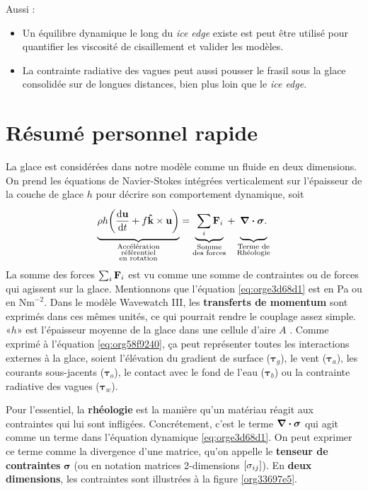 \documentclass[10pt]{article}
\numberwithin{equation}{section}
\newcommand{\kvf}{\vb{\hat{k}}}
\newcommand{\uu}{\vb{u}}
\newcommand{\venti}{\vphantom{\sum_x^x}}
\begin{document}
Aussi :
\begin{itemize}
\item Un équilibre dynamique le long du \emph{ice edge} existe est peut être utilisé pour quantifier les viscosité de cisaillement et valider les modèles.
\item La contrainte radiative des vagues peut aussi pousser le frasil sous la glace consolidée sur de longues distances, bien plus loin que le \emph{ice edge}.
\end{itemize}


\section{Résumé personnel rapide}
\label{sec:orga3a1ac9}

La glace est considérées dans notre modèle comme un fluide en deux dimensions.
On prend les équations de Navier-Stokes intégrées verticalement sur l'épaisseur de la couche de glace \(h\) pour décrire son comportement dynamique, soit
\begin{equation}
\label{eq:orge3d68d1}
    \underbrace{\venti\rho h\qty(\dv{\uu}{t} + f\kvf\times\uu)}_{\substack{\text{Accélération}\\\text{référentiel}\\\text{en rotation}}}
   =\underbrace{\venti\sum_i\vb{F}_i}_{\substack{\text{Somme}\\\text{des forces}}}
   +\underbrace{\venti\divergence{\boldsymbol{\sigma}}.}_{\substack{\text{Terme de}\\\text{Rhéologie}}}
\end{equation}
La somme des forces \(\sum_i \vb{F}_i\) est vu comme une somme de contraintes ou de forces qui agissent sur la glace.
Mentionnons que l'équation \ref{eq:orge3d68d1} est en Pa ou en \(\text{Nm}^{-2}\).
Dans le modèle Wavewatch III, les \textbf{transferts de momentum} sont exprimés dans ces mêmes unités, ce qui pourrait rendre le couplage assez simple.
«\(h\)» est l'épaisseur moyenne de la glace dans une cellule d'aire \(A\) \autocite[voir][pour un aperçu]{dumont2022marginal}. 
Comme exprimé à l'équation \ref{eq:org58f9240}, ça peut représenter toutes les interactions externes à la glace, soient l'élévation du gradient de surface (\(\boldsymbol{\tau}_g\)), le vent (\(\boldsymbol{\tau}_a\)), les courants sous-jacents (\(\boldsymbol{\tau}_o\)), le contact avec le fond de l'eau (\(\boldsymbol{\tau}_b\)) ou la contrainte radiative des vagues (\(\boldsymbol{\tau}_w\)).\bigskip

Pour l'essentiel, la \textbf{rhéologie} est la manière qu'un matériau réagit aux contraintes qui lui sont infligées.
Concrétement, c'est le terme \(\divergence{\boldsymbol{\sigma}}\) qui agit comme un terme dans l'équation dynamique \ref{eq:orge3d68d1}. 
On peut exprimer ce terme comme la divergence d'une matrice, qu'on appelle le \textbf{tenseur de contraintes} \(\boldsymbol{\sigma}\) (ou en notation matrices 2-dimensions \(\qty[\sigma_{ij}]\)).
En \textbf{deux dimensions}, les contraintes sont illustrées à la figure \ref{org33697e5}.\bigskip
\end{document}

